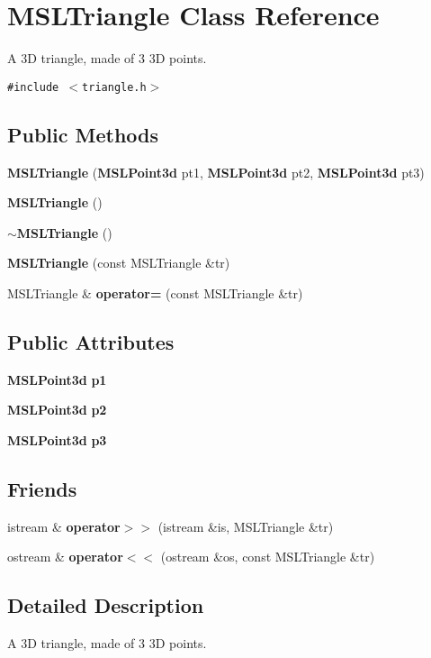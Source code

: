 \section{MSLTriangle  Class Reference}
\label{classMSLTriangle}
A 3D triangle, made of 3 3D points. 


{\tt \#include $<$triangle.h$>$}

\subsection*{Public Methods}
\begin{CompactItemize}
\item 
{\bf MSLTriangle} ({\bf MSLPoint3d} pt1, {\bf MSLPoint3d} pt2, {\bf MSLPoint3d} pt3)
\item 
{\bf MSLTriangle} ()
\item 
{\bf $\sim$MSLTriangle} ()
\item 
{\bf MSLTriangle} (const MSLTriangle \&tr)
\item 
MSLTriangle \& {\bf operator=} (const MSLTriangle \&tr)
\end{CompactItemize}
\subsection*{Public Attributes}
\begin{CompactItemize}
\item 
{\bf MSLPoint3d} {\bf p1}
\item 
{\bf MSLPoint3d} {\bf p2}
\item 
{\bf MSLPoint3d} {\bf p3}
\end{CompactItemize}
\subsection*{Friends}
\begin{CompactItemize}
\item 
istream \& {\bf operator$>$$>$} (istream \&is, MSLTriangle \&tr)
\item 
ostream \& {\bf operator$<$$<$} (ostream \&os, const MSLTriangle \&tr)
\end{CompactItemize}


\subsection{Detailed Description}
A 3D triangle, made of 3 3D points.



